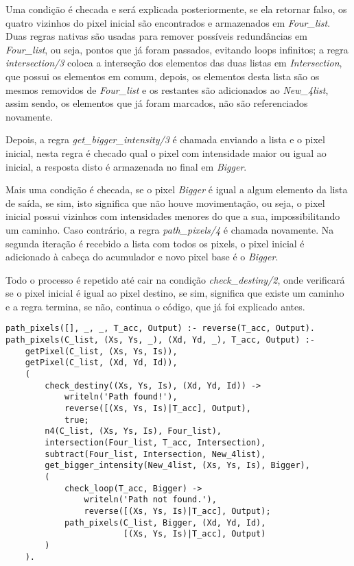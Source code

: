 \documentclass{article}
\begin{document}
        Uma condição é checada e será explicada posteriormente, se ela retornar
        falso, os quatro vizinhos do pixel inicial são encontrados e
        armazenados em \textit{Four\_list}. Duas regras nativas são usadas para
        remover possíveis redundâncias em \textit{Four\_list}, ou seja, pontos
        que já foram passados, evitando loops infinitos; a regra
        \textit{intersection/3} coloca a interseção dos elementos das duas
        listas em \textit{Intersection}, que possui os elementos em comum,
        depois, os elementos desta lista são os mesmos removidos de
        \textit{Four\_list} e os restantes são adicionados ao
        \textit{New\_4list}, assim sendo, os elementos que já foram marcados,
        não são referenciados novamente.
        
        Depois, a regra \textit{get\_bigger\_intensity/3} é chamada enviando a
        lista e o pixel inicial, nesta regra é checado qual o pixel com
        intensidade maior ou igual ao inicial, a resposta disto é armazenada no
        final em \textit{Bigger}.
        
        Mais uma condição é checada, se o pixel \textit{Bigger} é igual a algum
        elemento da lista de saída, se sim, isto significa que não houve
        movimentação, ou seja, o pixel inicial possui vizinhos com intensidades
        menores do que a sua, impossibilitando um caminho. Caso contrário, a
        regra \textit{path\_pixels/4} é chamada novamente. Na segunda iteração
        é recebido a lista com todos os pixels, o pixel inicial é adicionado à
        cabeça do acumulador e novo pixel base é o \textit{Bigger}.
        
        Todo o processo é repetido até cair na condição
        \textit{check\_destiny/2}, onde verificará se o pixel inicial é igual
        ao pixel destino, se sim, significa que existe um caminho e a regra
        termina, se não, continua o código, que já foi explicado antes.
        \begin{lstlisting}[frame=single]
path_pixels([], _, _, T_acc, Output) :- reverse(T_acc, Output).
path_pixels(C_list, (Xs, Ys, _), (Xd, Yd, _), T_acc, Output) :-
    getPixel(C_list, (Xs, Ys, Is)),
    getPixel(C_list, (Xd, Yd, Id)),
    (
        check_destiny((Xs, Ys, Is), (Xd, Yd, Id)) ->
            writeln('Path found!'),
            reverse([(Xs, Ys, Is)|T_acc], Output),
            true;
        n4(C_list, (Xs, Ys, Is), Four_list),
        intersection(Four_list, T_acc, Intersection),
        subtract(Four_list, Intersection, New_4list),
        get_bigger_intensity(New_4list, (Xs, Ys, Is), Bigger),
        (
            check_loop(T_acc, Bigger) ->
                writeln('Path not found.'),
                reverse([(Xs, Ys, Is)|T_acc], Output);
            path_pixels(C_list, Bigger, (Xd, Yd, Id), 
                        [(Xs, Ys, Is)|T_acc], Output)
        )
    ).
        \end{lstlisting}
        
\end{document}
